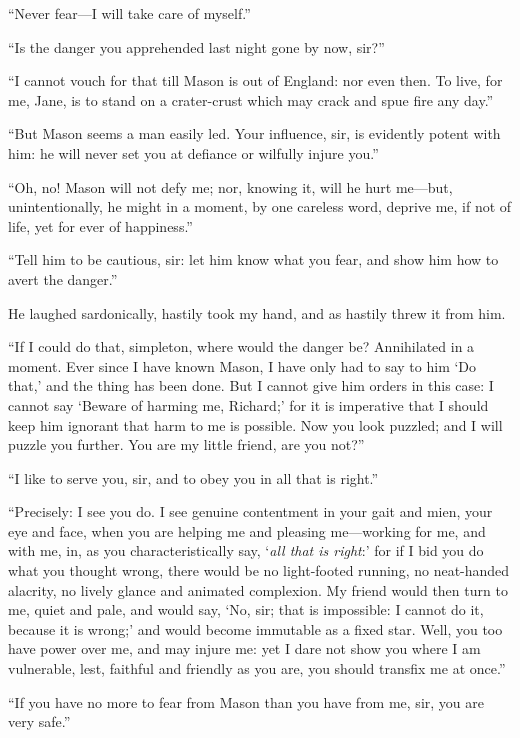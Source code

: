 \enquote{Never fear---I will take care of myself.}

\enquote{Is the danger you apprehended last night gone by now, sir?}

\enquote{I cannot vouch for that till Mason is out of England: nor even
then. To live, for me, Jane, is to stand on a crater-crust which may
crack and spue fire any day.}

\enquote{But \Mr{} Mason seems a man easily led. Your influence, sir, is
evidently potent with him: he will never set you at defiance or wilfully
injure you.}

\enquote{Oh, no! Mason will not defy me; nor, knowing it, will he hurt
me---but, unintentionally, he might in a moment, by one careless word,
deprive me, if not of life, yet for ever of happiness.}

\enquote{Tell him to be cautious, sir: let him know what you fear, and
show him how to avert the danger.}

He laughed sardonically, hastily took my hand, and as hastily threw it
from him.

\enquote{If I could do that, simpleton, where would the danger be? 
Annihilated in a moment. Ever since I have known Mason, I have only had
to say to him \enquote{Do that,} and the thing has been done. But I
cannot give him orders in this case: I cannot say \enquote{Beware of
harming me, Richard;} for it is imperative that I should keep him
ignorant that harm to me is possible. Now you look puzzled; and I will
puzzle you further. You are my little friend, are you not?}

\enquote{I like to serve you, sir, and to obey you in all that is
right.}

\enquote{Precisely: I see you do. I see genuine contentment in your gait and
mien, your eye and face, when you are helping me and pleasing
me---working for me, and with me, in, as you characteristically say,
\enquote{\emph{all that is right}:} for if I bid you do what you thought wrong,
there would be no light-footed running, no neat-handed alacrity, no
lively glance and animated complexion. My friend would then turn to me,
quiet and pale, and would say, \enquote{No, sir; that is impossible: I
cannot do it, because it is wrong;} and would become immutable as a
fixed star. Well, you too have power over me, and may injure me: yet I
dare not show you where I am vulnerable, lest, faithful and friendly as
you are, you should transfix me at once.}

\enquote{If you have no more to fear from \Mr{} Mason than you have from
me, sir, you are very safe.}

